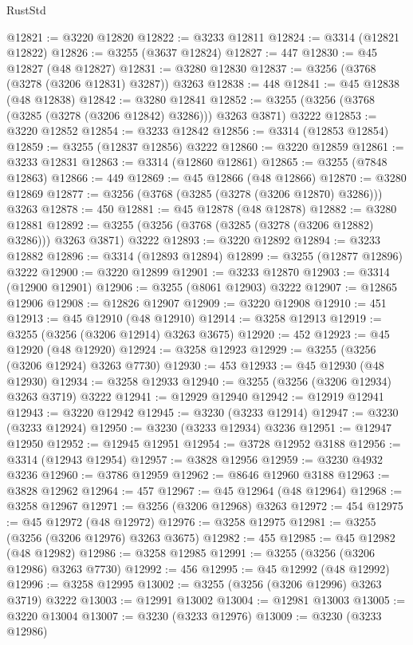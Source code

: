 \begin{lexlean}{RustStd}
\begin{coremodule}
@12821 := @3220 @12820
@12822 := @3233 @12811
@12824 := @3314 (@12821 @12822)
@12826 := @3255 (@3637 @12824)
@12827 := 447
@12830 := @45 @12827 (@48 @12827)
@12831 := @3280 @12830
@12837 := @3256 (@3768 (@3278 (@3206 @12831) @3287)) @3263
@12838 := 448
@12841 := @45 @12838 (@48 @12838)
@12842 := @3280 @12841
@12852 := @3255 (@3256 (@3768 (@3285 (@3278 (@3206 @12842) @3286))) @3263 @3871) @3222
@12853 := @3220 @12852
@12854 := @3233 @12842
@12856 := @3314 (@12853 @12854)
@12859 := @3255 (@12837 @12856) @3222
@12860 := @3220 @12859
@12861 := @3233 @12831
@12863 := @3314 (@12860 @12861)
@12865 := @3255 (@7848 @12863)
@12866 := 449
@12869 := @45 @12866 (@48 @12866)
@12870 := @3280 @12869
@12877 := @3256 (@3768 (@3285 (@3278 (@3206 @12870) @3286))) @3263
@12878 := 450
@12881 := @45 @12878 (@48 @12878)
@12882 := @3280 @12881
@12892 := @3255 (@3256 (@3768 (@3285 (@3278 (@3206 @12882) @3286))) @3263 @3871) @3222
@12893 := @3220 @12892
@12894 := @3233 @12882
@12896 := @3314 (@12893 @12894)
@12899 := @3255 (@12877 @12896) @3222
@12900 := @3220 @12899
@12901 := @3233 @12870
@12903 := @3314 (@12900 @12901)
@12906 := @3255 (@8061 @12903) @3222
@12907 := @12865 @12906
@12908 := @12826 @12907
@12909 := @3220 @12908
@12910 := 451
@12913 := @45 @12910 (@48 @12910)
@12914 := @3258 @12913
@12919 := @3255 (@3256 (@3206 @12914) @3263 @3675)
@12920 := 452
@12923 := @45 @12920 (@48 @12920)
@12924 := @3258 @12923
@12929 := @3255 (@3256 (@3206 @12924) @3263 @7730)
@12930 := 453
@12933 := @45 @12930 (@48 @12930)
@12934 := @3258 @12933
@12940 := @3255 (@3256 (@3206 @12934) @3263 @3719) @3222
@12941 := @12929 @12940
@12942 := @12919 @12941
@12943 := @3220 @12942
@12945 := @3230 (@3233 @12914)
@12947 := @3230 (@3233 @12924)
@12950 := @3230 (@3233 @12934) @3236
@12951 := @12947 @12950
@12952 := @12945 @12951
@12954 := @3728 @12952 @3188
@12956 := @3314 (@12943 @12954)
@12957 := @3828 @12956
@12959 := @3230 @4932 @3236
@12960 := @3786 @12959
@12962 := @8646 @12960 @3188
@12963 := @3828 @12962
@12964 := 457
@12967 := @45 @12964 (@48 @12964)
@12968 := @3258 @12967
@12971 := @3256 (@3206 @12968) @3263
@12972 := 454
@12975 := @45 @12972 (@48 @12972)
@12976 := @3258 @12975
@12981 := @3255 (@3256 (@3206 @12976) @3263 @3675)
@12982 := 455
@12985 := @45 @12982 (@48 @12982)
@12986 := @3258 @12985
@12991 := @3255 (@3256 (@3206 @12986) @3263 @7730)
@12992 := 456
@12995 := @45 @12992 (@48 @12992)
@12996 := @3258 @12995
@13002 := @3255 (@3256 (@3206 @12996) @3263 @3719) @3222
@13003 := @12991 @13002
@13004 := @12981 @13003
@13005 := @3220 @13004
@13007 := @3230 (@3233 @12976)
@13009 := @3230 (@3233 @12986)

\end{coremodule}
\end{lexlean}
